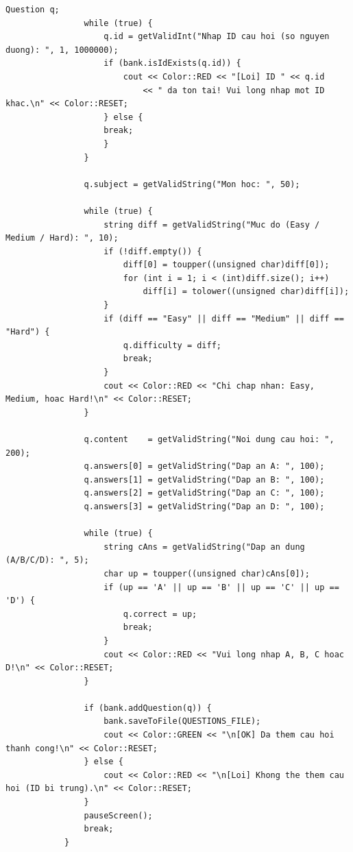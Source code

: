 \documentclass[11pt]{report}
\begin{document}
\begin{lstlisting}[caption={Menu.cpp -- Cài đặt giao diện Menu và điều hướng}, label={lst:full_menu_cpp}]
                Question q;
                while (true) {
                    q.id = getValidInt("Nhap ID cau hoi (so nguyen duong): ", 1, 1000000);
                    if (bank.isIdExists(q.id)) {
                        cout << Color::RED << "[Loi] ID " << q.id
                            << " da ton tai! Vui long nhap mot ID khac.\n" << Color::RESET;
                    } else {
                    break;
                    }
                }

                q.subject = getValidString("Mon hoc: ", 50);

                while (true) {
                    string diff = getValidString("Muc do (Easy / Medium / Hard): ", 10);
                    if (!diff.empty()) {
                        diff[0] = toupper((unsigned char)diff[0]);
                        for (int i = 1; i < (int)diff.size(); i++)
                            diff[i] = tolower((unsigned char)diff[i]);
                    }
                    if (diff == "Easy" || diff == "Medium" || diff == "Hard") {
                        q.difficulty = diff;
                        break;
                    }
                    cout << Color::RED << "Chi chap nhan: Easy, Medium, hoac Hard!\n" << Color::RESET;
                }

                q.content    = getValidString("Noi dung cau hoi: ", 200);
                q.answers[0] = getValidString("Dap an A: ", 100);
                q.answers[1] = getValidString("Dap an B: ", 100);
                q.answers[2] = getValidString("Dap an C: ", 100);
                q.answers[3] = getValidString("Dap an D: ", 100);

                while (true) {
                    string cAns = getValidString("Dap an dung (A/B/C/D): ", 5);
                    char up = toupper((unsigned char)cAns[0]);
                    if (up == 'A' || up == 'B' || up == 'C' || up == 'D') {
                        q.correct = up;
                        break;
                    }
                    cout << Color::RED << "Vui long nhap A, B, C hoac D!\n" << Color::RESET;
                }

                if (bank.addQuestion(q)) {
                    bank.saveToFile(QUESTIONS_FILE);
                    cout << Color::GREEN << "\n[OK] Da them cau hoi thanh cong!\n" << Color::RESET;
                } else {
                    cout << Color::RED << "\n[Loi] Khong the them cau hoi (ID bi trung).\n" << Color::RESET;
                }
                pauseScreen();
                break;
            }


\end{lstlisting}
\end{document}
